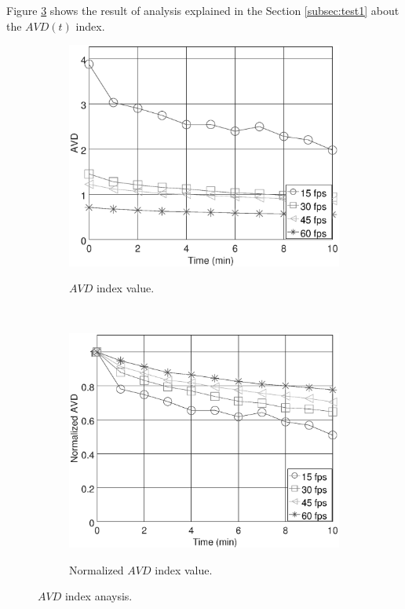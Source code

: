 \documentclass[review]{elsarticle}
\begin{document}
Figure \ref{fig:AVDtest1} shows the result of analysis explained in the 
Section \ref{subsec:test1} about the $AVD(t)$ index.
\begin{figure}[ht!]
    \centering
    \begin{subfigure}{0.48\textwidth}
        \caption{$AVD$ index value.}
        \includegraphics[width=\textwidth]{FPS_f11_rawAVD.eps}
        \label{fig:avdraw}
    \end{subfigure}
    ~ %
    \begin{subfigure}{0.48\textwidth}
        \caption{Normalized $AVD$ index value.}
        \includegraphics[width=\textwidth]{FPS_f11_norm1AVD.eps}
        \label{fig:avdnorm}
    \end{subfigure}
    \caption{$AVD$ index anaysis.}\label{fig:AVDtest1}
\end{figure}
\end{document}
